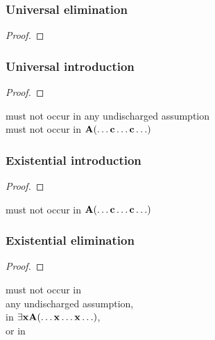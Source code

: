 \begin{multicols}{2}
\subsubsection*{Universal elimination}

\begin{proof}
	 
\end{proof}

\subsubsection*{Universal introduction}

\begin{proof}
	 
\end{proof}

\noindent 	{} must not occur in any undischarged assumption\\ 
 must not occur in $\mathbf{A}(\ldots \mathbf{c} \ldots \mathbf{c}\ldots)$


\subsubsection*{Existential introduction}

\begin{proof}
	 
\end{proof}

\noindent {} must not occur in $\mathbf{A}(\ldots \mathbf{c} \ldots \mathbf{c}\ldots)$

\subsubsection*{Existential elimination}

\begin{proof}
	\open	
		\ellipsesline
	\close
	 
\end{proof}

\noindent {} must not occur in \\any undischarged assumption, \\in $\exists \mathbf{x}\mathbf{A}(\ldots \mathbf{x} \ldots \mathbf{x}\ldots)$, \\or in 
\end{multicols}

